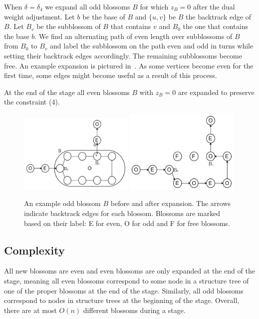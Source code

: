 When $\delta = \delta_4$ we expand all odd blossoms $B$ for which $z_B = 0$ after the dual weight adjustment. Let $b$ be the base of $B$ and $\{u, v\}$ be $B$ the backtrack edge of $B$. Let $B_v$ be the subblossom of $B$ that contains $v$ and $B_0$ the one that contains the base $b$. We find an alternating path of even length over subblossoms of $B$ from $B_0$ to $B_v$ and label the subblossom on the path even and odd in turns while setting their backtrack edges accordingly. The remaining subblossoms become free. An example expansion is pictured in~. As some vertices become even for the first time, some edges might become useful as a result of this process.

At the end of the stage all even blossoms $B$ with $z_B = 0$ are expanded to preserve the constraint (4).

\begin{figure}
    \centering
    \includegraphics*[width=0.49\textwidth]{figures/Odd expansion.png}
    \includegraphics*[width=0.49\textwidth]{figures/Odd expanded.png}
    \caption{An example odd blossom $B$ before and after expansion. The arrows indicate backtrack edges for each blossom. Blossoms are marked based on their label: E for even, O for odd and F for free blossoms.}
\end{figure}

\subsection{Complexity}

All new blossoms are even and even blossoms are only expanded at the end of the stage, meaning all even blossoms correspond to some node in a structure tree of one of the proper blossoms at the end of the stage. Similarly, all odd blossoms correspond to nodes in structure trees at the beginning of the stage. Overall, there are at most $O(n)$ different blossoms during a stage. 

